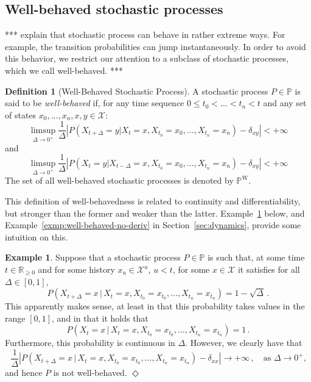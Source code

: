 \documentclass[10pt]{paper}
\theoremstyle{definition}
\newtheorem{exmp}{Example}%
\newtheorem{definition}{Definition}
\newcommand{\reals}{\mathbb{R}}
\newcommand{\realsnonneg}{\reals_{\geq 0}}
\newcommand{\states}{\mathcal{X}}
\newcommand{\processes}{\mathbb{P}}
\newcommand{\wprocesses}{\processes^{\mathrm{W}}}
\newcommand{\abs}[1]{\left\vert #1 \right\vert}
\newcommand{\exampleend}{\hfill$\Diamond$}
\begin{document}
\subsection{Well-behaved stochastic processes}\label{sec:well_behaved}

*** explain that stochastic process can behave in rather extreme ways. For example, the transition probabilities can jump instantaneously. In order to avoid this behavior, we restrict our attention to a subclass of stochastic processes, which we call well-behaved. ***

\begin{definition}[Well-Behaved Stochastic Process]
\label{def:well-behaved}
A stochastic process $P\in\processes$ is said to be \emph{well-behaved} if, for any time sequence $0\leq t_0<\dots<t_{n}<t$ and any set of states $x_{0},\dots,x_{n},x,y\in\states$:
\begin{equation*}
\limsup_{\Delta\to 0^{+}}\frac{1}{\Delta}\abs{P(X_{t+\Delta}=y\vert X_t=x, X_{t_0}=x_{0}, \dots, X_{t_n}=x_{n})-\delta_{xy}}<+\infty
\end{equation*}
and
\begin{equation*}
\limsup_{\Delta\to 0^{+}}\frac{1}{\Delta}\abs{P(X_{t}=y\vert X_{t-\Delta}=x, X_{t_0}=x_{0}, \dots, X_{t_n}=x_{n})-\delta_{xy}}<+\infty
\end{equation*}
The set of all well-behaved stochastic processes is denoted by $\wprocesses$.
\end{definition}

This definition of well-behavedness is related to continuity and differentiability, but stronger than the former and weaker than the latter. Example~\ref{exmp:well-behaved} below, and Example~\ref{exmp:well-behaved-no-deriv} in Section~\ref{sec:dynamics}, provide some intuition on this.

\begin{exmp}\label{exmp:well-behaved}
Suppose that a stochastic process $P\in\processes$ is such that, at some time $t\in\realsnonneg$ and for some history $x_u\in\states^u$, $u<t$, for some $x\in\states$ it satisfies for all $\Delta\in[0,1]$,
\begin{equation*}
P(X_{t+\Delta}=x\,\vert\,X_{t}=x,X_{t_0}=x_{t_0},\ldots,X_{t_n}=x_{t_n}) = 1-\sqrt{\Delta}\,.
\end{equation*}
This apparently makes sense, at least in that this probability takes values in the range $[0,1]$, and in that it holds that
\begin{equation*}
P(X_{t}=x\,\vert\,X_{t}=x,X_{t_0}=x_{t_0},\ldots,X_{t_n}=x_{t_n}) = 1\,.
\end{equation*}
Furthermore, this probability is continuous in $\Delta$. However, we clearly have that
\begin{equation*}
\frac{1}{\Delta}\abs{P(X_{t+\Delta}=x\,\vert\,X_{t}=x,X_{t_0}=x_{t_0},\ldots,X_{t_n}=x_{t_n}) - \delta_{xx}} \to +\infty\,,\quad\text{as $\Delta\to0^+$,}
\end{equation*}
and hence $P$ is not well-behaved.
\exampleend
\end{exmp}
\end{document}
